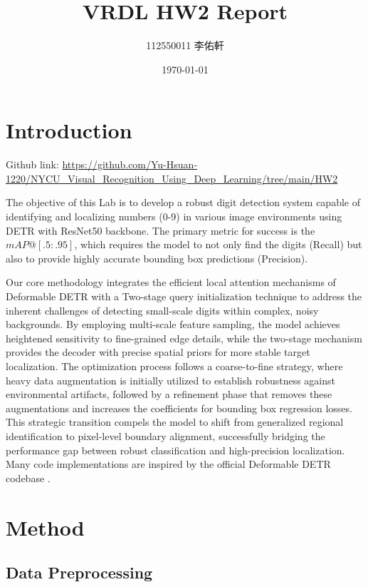\documentclass[a4paper]{article} %
\title{VRDL HW2 Report}
\author{112550011 李佑軒}
\date{\today}
\begin{document}
\maketitle %

\section{Introduction}

Github link: \url{https://github.com/Yu-Hsuan-1220/NYCU_Visual_Recognition_Using_Deep_Learning/tree/main/HW2}

The objective of this Lab is to develop a robust digit detection system capable of identifying and localizing numbers (0-9) in various image environments using DETR with ResNet50 backbone. The primary metric for success is the $mAP@[.5:.95]$, which requires the model to not only find the digits (Recall) but also to provide highly accurate bounding box predictions (Precision).

Our core methodology integrates the efficient local attention mechanisms of Deformable DETR with a Two-stage query initialization technique to address the inherent challenges of detecting small-scale digits within complex, noisy backgrounds. By employing multi-scale feature sampling, the model achieves heightened sensitivity to fine-grained edge details, while the two-stage mechanism provides the decoder with precise spatial priors for more stable target localization. The optimization process follows a coarse-to-fine strategy, where heavy data augmentation is initially utilized to establish robustness against environmental artifacts, followed by a refinement phase that removes these augmentations and increases the coefficients for bounding box regression losses. This strategic transition compels the model to shift from generalized regional identification to pixel-level boundary alignment, successfully bridging the performance gap between robust classification and high-precision localization. Many code implementations are inspired by the official Deformable DETR codebase \cite{Deformable_DETR_github_ref}.

\section{Method}

\subsection{Data Preprocessing}
\end{document}
